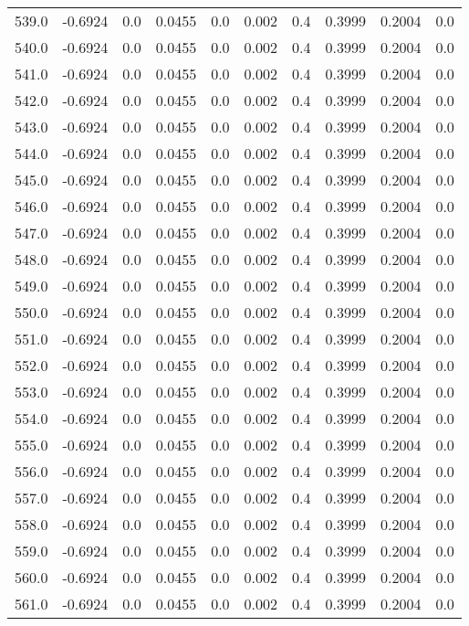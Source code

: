 \begin{longtable}{lrrrrrrrrr}
539.0 & -0.6924 & 0.0 & 0.0455 & 0.0 & 0.002 & 0.4 & 0.3999 & 0.2004 & 0.0 \\
540.0 & -0.6924 & 0.0 & 0.0455 & 0.0 & 0.002 & 0.4 & 0.3999 & 0.2004 & 0.0 \\
541.0 & -0.6924 & 0.0 & 0.0455 & 0.0 & 0.002 & 0.4 & 0.3999 & 0.2004 & 0.0 \\
542.0 & -0.6924 & 0.0 & 0.0455 & 0.0 & 0.002 & 0.4 & 0.3999 & 0.2004 & 0.0 \\
543.0 & -0.6924 & 0.0 & 0.0455 & 0.0 & 0.002 & 0.4 & 0.3999 & 0.2004 & 0.0 \\
544.0 & -0.6924 & 0.0 & 0.0455 & 0.0 & 0.002 & 0.4 & 0.3999 & 0.2004 & 0.0 \\
545.0 & -0.6924 & 0.0 & 0.0455 & 0.0 & 0.002 & 0.4 & 0.3999 & 0.2004 & 0.0 \\
546.0 & -0.6924 & 0.0 & 0.0455 & 0.0 & 0.002 & 0.4 & 0.3999 & 0.2004 & 0.0 \\
547.0 & -0.6924 & 0.0 & 0.0455 & 0.0 & 0.002 & 0.4 & 0.3999 & 0.2004 & 0.0 \\
548.0 & -0.6924 & 0.0 & 0.0455 & 0.0 & 0.002 & 0.4 & 0.3999 & 0.2004 & 0.0 \\
549.0 & -0.6924 & 0.0 & 0.0455 & 0.0 & 0.002 & 0.4 & 0.3999 & 0.2004 & 0.0 \\
550.0 & -0.6924 & 0.0 & 0.0455 & 0.0 & 0.002 & 0.4 & 0.3999 & 0.2004 & 0.0 \\
551.0 & -0.6924 & 0.0 & 0.0455 & 0.0 & 0.002 & 0.4 & 0.3999 & 0.2004 & 0.0 \\
552.0 & -0.6924 & 0.0 & 0.0455 & 0.0 & 0.002 & 0.4 & 0.3999 & 0.2004 & 0.0 \\
553.0 & -0.6924 & 0.0 & 0.0455 & 0.0 & 0.002 & 0.4 & 0.3999 & 0.2004 & 0.0 \\
554.0 & -0.6924 & 0.0 & 0.0455 & 0.0 & 0.002 & 0.4 & 0.3999 & 0.2004 & 0.0 \\
555.0 & -0.6924 & 0.0 & 0.0455 & 0.0 & 0.002 & 0.4 & 0.3999 & 0.2004 & 0.0 \\
556.0 & -0.6924 & 0.0 & 0.0455 & 0.0 & 0.002 & 0.4 & 0.3999 & 0.2004 & 0.0 \\
557.0 & -0.6924 & 0.0 & 0.0455 & 0.0 & 0.002 & 0.4 & 0.3999 & 0.2004 & 0.0 \\
558.0 & -0.6924 & 0.0 & 0.0455 & 0.0 & 0.002 & 0.4 & 0.3999 & 0.2004 & 0.0 \\
559.0 & -0.6924 & 0.0 & 0.0455 & 0.0 & 0.002 & 0.4 & 0.3999 & 0.2004 & 0.0 \\
560.0 & -0.6924 & 0.0 & 0.0455 & 0.0 & 0.002 & 0.4 & 0.3999 & 0.2004 & 0.0 \\
561.0 & -0.6924 & 0.0 & 0.0455 & 0.0 & 0.002 & 0.4 & 0.3999 & 0.2004 & 0.0 \\

\end{longtable}
